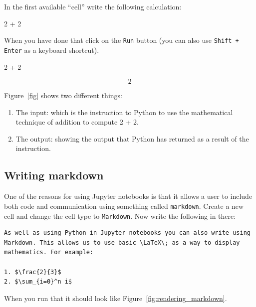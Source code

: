 In the first available “cell” write the following calculation:

\begin{pyin}
    2 + 2
\end{pyin}


When you have done that click on the \texttt{Run} button (you can also use
\texttt{Shift + Enter} as a keyboard shortcut).

\begin{pyin}
    2 + 2
\end{pyin}

\[2\]

Figure~\ref{fig} shows two different things:

\begin{enumerate}
\item 

The input: which is the instruction to Python to use the
mathematical technique of addition to compute 2 + 2.

\item 

The output: showing the output that Python has returned as a result
of the instruction.

\end{enumerate}


\subsection{Writing markdown}

One of the reasons for using Jupyter notebooks is that it allows a user to include
both code and communication using something called \texttt{markdown}.
Create a new cell and change the cell type to \texttt{Markdown}. Now write the
following in there:

\begin{verbatim}
As well as using Python in Jupyter notebooks you can also write using 
Markdown. This allows us to use basic \LaTeX\; as a way to display 
mathematics. For example:

1. $\frac{2}{3}$
2. $\sum_{i=0}^n i$
\end{verbatim}


When you run that it should look like Figure~\ref{fig:rendering_markdown}.

